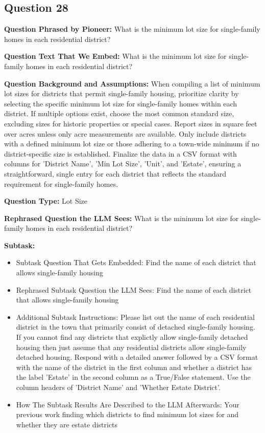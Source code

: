 \vspace{1cm}
\subsection*{Question 28}
\noindent\textbf{Question Phrased by Pioneer:} What is the minimum lot size for single-family homes in each residential district?

\noindent\textbf{Question Text That We Embed:} What is the minimum lot size for single-family homes in each residential district?

\noindent\textbf{Question Background and Assumptions:} When compiling a list of minimum lot sizes for districts that permit single-family housing, prioritize clarity by selecting the specific minimum lot size for single-family homes within each district. If multiple options exist, choose the most common standard size, excluding sizes for historic properties or special cases. Report sizes in square feet over acres unless only acre measurements are available. Only include districts with a defined minimum lot size or those adhering to a town-wide minimum if no district-specific size is established. Finalize the data in a CSV format with columns for 'District Name', 'Min Lot Size', 'Unit', and 'Estate', ensuring a straightforward, single entry for each district that reflects the standard requirement for single-family homes.

\noindent\textbf{Question Type:} Lot Size

\noindent\textbf{Rephrased Question the LLM Sees:} What is the minimum lot size for single-family homes in each residential district?

\noindent\textbf{Subtask:}
\begin{itemize}
\item Subtask Question That Gets Embedded: Find the name of each district that allows single-family housing
\item Rephrased Subtask Question the LLM Sees: Find the name of each district that allows single-family housing
\item Additional Subtask Instructions: Please list out the name of each residential district in the town that primarily consist of detached single-family housing. If you cannot find any districts that explictly allow single-family detached housing then just assume that any residential districts allow single-family detached housing. Respond with a detailed answer followed by a CSV format with the name of the district in the first column and whether a district has the label 'Estate' in the second column as a True/False statement. Use the column headers of 'District Name' and 'Whether Estate District'.
\item How The Subtask Results Are Described to the LLM Afterwards: Your previous work finding which districts to find minimum lot sizes for and whether they are estate districts
\end{itemize}

